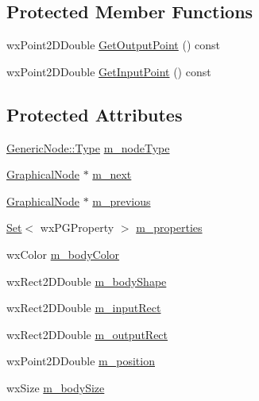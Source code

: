 \subsection*{Protected Member Functions}
\begin{DoxyCompactItemize}
\item 
wx\+Point2\+D\+Double \hyperlink{class_graphical_node_a5e0a98450d511bb024e1746ab42d34c4}{Get\+Output\+Point} () const
\item 
wx\+Point2\+D\+Double \hyperlink{class_graphical_node_a29991fc9117db0975aa1a61d0df48822}{Get\+Input\+Point} () const
\end{DoxyCompactItemize}
\subsection*{Protected Attributes}
\begin{DoxyCompactItemize}
\item 
\hyperlink{class_generic_node_a9e7985ab9bbfa1c85091adc0ab71a6b6}{Generic\+Node\+::\+Type} \hyperlink{class_graphical_node_a8d2546ba2e20ff4eb546de82109e2ac8}{m\+\_\+node\+Type}
\item 
\hyperlink{class_graphical_node}{Graphical\+Node} $\ast$ \hyperlink{class_graphical_node_a96b667de782400463e9106af4eacb854}{m\+\_\+next}
\item 
\hyperlink{class_graphical_node}{Graphical\+Node} $\ast$ \hyperlink{class_graphical_node_a968283abe8cfcfd48900e7d6943cb435}{m\+\_\+previous}
\item 
\hyperlink{class_set}{Set}$<$ wx\+P\+G\+Property $>$ \hyperlink{class_graphical_node_a7f45ea17bdca2d822ef4d604effcca0e}{m\+\_\+properties}
\item 
wx\+Color \hyperlink{class_graphical_node_a2bcf3e642619e571bd8b5eca3e7bdbb6}{m\+\_\+body\+Color}
\item 
wx\+Rect2\+D\+Double \hyperlink{class_graphical_node_a9a246386a855e540a97d7f905ad53ba0}{m\+\_\+body\+Shape}
\item 
wx\+Rect2\+D\+Double \hyperlink{class_graphical_node_a83044c99e5ec1898790372dbd47eb612}{m\+\_\+input\+Rect}
\item 
wx\+Rect2\+D\+Double \hyperlink{class_graphical_node_a32936705d981530b574fc66d5553ab9a}{m\+\_\+output\+Rect}
\item 
wx\+Point2\+D\+Double \hyperlink{class_graphical_node_aa93feffd6ce9c9ea4b5063599927fbdc}{m\+\_\+position}
\item 
wx\+Size \hyperlink{class_graphical_node_ab91a1047e6b852fda6828e44d4af1929}{m\+\_\+body\+Size}

\end{DoxyCompactItemize}
